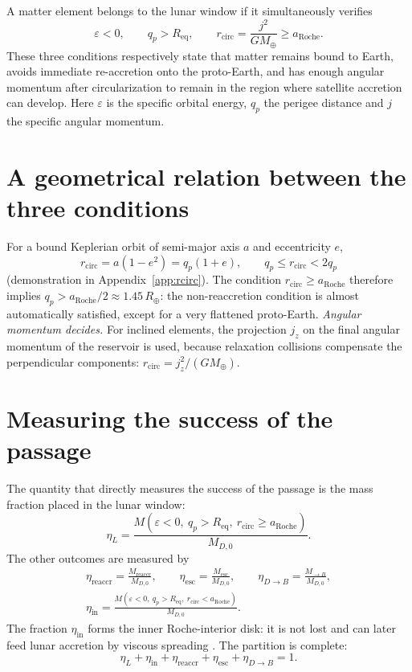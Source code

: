 \documentclass[11pt,a4paper,openany]{report}
\newcommand{\Mt}{M_{\oplus}}
\newcommand{\Rt}{R_{\oplus}}
\newcommand{\Req}{R_{\mathrm{eq}}}
\newcommand{\aR}{a_{\mathrm{Roche}}}
\begin{document}
A matter element belongs to the lunar window if it simultaneously verifies
\begin{equation}
\boxed{\;\varepsilon<0,\qquad q_p>\Req,\qquad r_{\mathrm{circ}}=\frac{j^2}{G\Mt}\ge\aR.\;}
\label{eq:fenetre}
\end{equation}
These three conditions respectively state that matter remains bound to Earth, avoids immediate
re-accretion onto the proto-Earth, and has enough angular momentum after circularization to remain
in the region where satellite accretion can develop. Here $\varepsilon$ is the specific orbital
energy, $q_p$ the perigee distance and $j$ the specific angular momentum.

\section{A geometrical relation between the three conditions}

For a bound Keplerian orbit of semi-major axis $a$ and eccentricity $e$,
\begin{equation}
r_{\mathrm{circ}}=a(1-e^2)=q_p(1+e),\qquad q_p\le r_{\mathrm{circ}}<2q_p
\label{eq:rcirc-qp}
\end{equation}
(demonstration in Appendix~\ref{app:rcirc}). The condition $r_{\mathrm{circ}}\ge\aR$ therefore
implies $q_p>\aR/2\approx1.45\,\Rt$: the non-reaccretion condition is almost automatically
satisfied, except for a very flattened proto-Earth. \emph{Angular momentum decides.} For inclined
elements, the projection $j_z$ on the final angular momentum of the reservoir is used, because
relaxation collisions compensate the perpendicular components: $r_{\mathrm{circ}}=j_z^2/(G\Mt)$.

\section{Measuring the success of the passage}

The quantity that directly measures the success of the passage is the mass fraction placed in the
lunar window:
\begin{equation}
\boxed{\;\eta_L=\frac{M\!\left(\varepsilon<0,\ q_p>\Req,\ r_{\mathrm{circ}}\ge\aR\right)}{M_{D,0}}.\;}
\label{eq:etaL}
\end{equation}
The other outcomes are measured by
\begin{equation}
\begin{gathered}
\eta_{\mathrm{reaccr}}=\frac{M_{\mathrm{reaccr}}}{M_{D,0}},\qquad
\eta_{\mathrm{esc}}=\frac{M_{\mathrm{esc}}}{M_{D,0}},\qquad
\eta_{D\to B}=\frac{M_{\to B}}{M_{D,0}},\\[4pt]
\eta_{\mathrm{in}}=\frac{M(\varepsilon<0,\ q_p>\Req,\ r_{\mathrm{circ}}<\aR)}{M_{D,0}}.
\end{gathered}
\label{eq:etas}
\end{equation}
The fraction $\eta_{\mathrm{in}}$ forms the inner Roche-interior disk: it is not lost and can later
feed lunar accretion by viscous spreading \cite{SalmonCanup2012}. The partition is complete:
\begin{equation}
\boxed{\;\eta_L+\eta_{\mathrm{in}}+\eta_{\mathrm{reaccr}}+\eta_{\mathrm{esc}}+\eta_{D\to B}=1.\;}
\label{eq:partition}
\end{equation}
\end{document}
